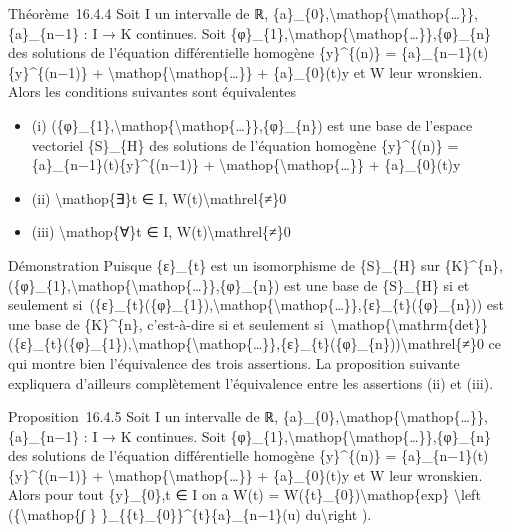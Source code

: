 \documentclass[]{article}
\begin{document}
Théorème~16.4.4 Soit I un intervalle de ℝ,
\{a\}\_\{0\},\textbackslash{}mathop\{\textbackslash{}mathop\{\ldots{}\}\},\{a\}\_\{n−1\}
: I → K continues. Soit
\{φ\}\_\{1\},\textbackslash{}mathop\{\textbackslash{}mathop\{\ldots{}\}\},\{φ\}\_\{n\}
des solutions de l'équation différentielle homogène \{y\}\^{}\{(n)\} =
\{a\}\_\{n−1\}(t)\{y\}\^{}\{(n−1)\} +
\textbackslash{}mathop\{\textbackslash{}mathop\{\ldots{}\}\} +
\{a\}\_\{0\}(t)y et W leur wronskien. Alors les conditions suivantes
sont équivalentes

\begin{itemize}
\itemsep1pt\parskip0pt
\item
  (i)
  (\{φ\}\_\{1\},\textbackslash{}mathop\{\textbackslash{}mathop\{\ldots{}\}\},\{φ\}\_\{n\})
  est une base de l'espace vectoriel \{S\}\_\{H\} des solutions de
  l'équation homogène \{y\}\^{}\{(n)\} =
  \{a\}\_\{n−1\}(t)\{y\}\^{}\{(n−1)\} +
  \textbackslash{}mathop\{\textbackslash{}mathop\{\ldots{}\}\} +
  \{a\}\_\{0\}(t)y
\item
  (ii) \textbackslash{}mathop\{∃\}t ∈ I,
  W(t)\textbackslash{}mathrel\{≠\}0
\item
  (iii) \textbackslash{}mathop\{∀\}t ∈ I,
  W(t)\textbackslash{}mathrel\{≠\}0
\end{itemize}

Démonstration Puisque \{ε\}\_\{t\} est un isomorphisme de \{S\}\_\{H\}
sur \{K\}\^{}\{n\},
(\{φ\}\_\{1\},\textbackslash{}mathop\{\textbackslash{}mathop\{\ldots{}\}\},\{φ\}\_\{n\})
est une base de \{S\}\_\{H\} si et seulement
si~(\{ε\}\_\{t\}(\{φ\}\_\{1\}),\textbackslash{}mathop\{\textbackslash{}mathop\{\ldots{}\}\},\{ε\}\_\{t\}(\{φ\}\_\{n\}))
est une base de \{K\}\^{}\{n\}, c'est-à-dire si et seulement
si~\textbackslash{}mathop\{\textbackslash{}mathrm\{det\}\}
(\{ε\}\_\{t\}(\{φ\}\_\{1\}),\textbackslash{}mathop\{\textbackslash{}mathop\{\ldots{}\}\},\{ε\}\_\{t\}(\{φ\}\_\{n\}))\textbackslash{}mathrel\{≠\}0
ce qui montre bien l'équivalence des trois assertions. La proposition
suivante expliquera d'ailleurs complètement l'équivalence entre les
assertions (ii) et (iii).

Proposition~16.4.5 Soit I un intervalle de ℝ,
\{a\}\_\{0\},\textbackslash{}mathop\{\textbackslash{}mathop\{\ldots{}\}\},\{a\}\_\{n−1\}
: I → K continues. Soit
\{φ\}\_\{1\},\textbackslash{}mathop\{\textbackslash{}mathop\{\ldots{}\}\},\{φ\}\_\{n\}
des solutions de l'équation différentielle homogène \{y\}\^{}\{(n)\} =
\{a\}\_\{n−1\}(t)\{y\}\^{}\{(n−1)\} +
\textbackslash{}mathop\{\textbackslash{}mathop\{\ldots{}\}\} +
\{a\}\_\{0\}(t)y et W leur wronskien. Alors pour tout \{y\}\_\{0\},t ∈ I
on a W(t) = W(\{t\}\_\{0\})\textbackslash{}mathop\{exp\}
\textbackslash{}left (\{\textbackslash{}mathop\{∫ \}
\}\_\{\{t\}\_\{0\}\}\^{}\{t\}\{a\}\_\{n−1\}(u) du\textbackslash{}right
).
\end{document}
